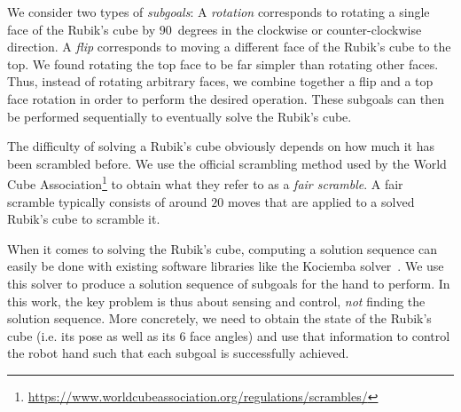 We consider two types of \emph{subgoals}: A \emph{rotation} corresponds to rotating a single face of the Rubik's cube by $90$~degrees in the clockwise or counter-clockwise direction. A \emph{flip} corresponds to moving a different face of the Rubik's cube to the top. We found rotating the top face to be far simpler than rotating other faces. Thus, instead of rotating arbitrary faces, we combine together a flip and a top face rotation in order to perform the desired operation. These subgoals can then be performed sequentially to eventually solve the Rubik's cube.

The difficulty of solving a Rubik's cube obviously depends on how much it has been scrambled before. We use the official scrambling method used by the World Cube Association\footnote{\url{https://www.worldcubeassociation.org/regulations/scrambles/}} to obtain what they refer to as a \emph{fair scramble}. A fair scramble typically consists of around $20$ moves that are applied to a solved Rubik's cube to scramble it.

When it comes to solving the Rubik's cube, computing a solution sequence can easily be done with existing software libraries like the Kociemba solver~\cite{kociemba}. We use this solver to produce a solution sequence of subgoals for the hand to perform. In this work, the key problem is thus about sensing and control, \emph{not} finding the solution sequence. More concretely, we need to obtain the state of the Rubik's cube (i.e. its pose as well as its 6 face angles) and use that information to control the robot hand such that each subgoal is successfully achieved.
